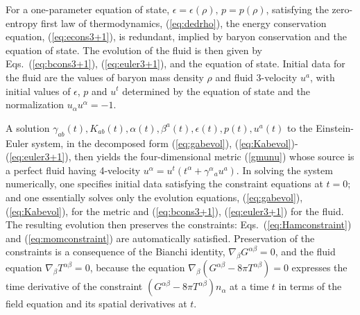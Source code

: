\documentclass[12pt]{article}
\def\a{\alpha}
\def\b{\beta}
\def\g{\gamma}
\def\a{\alpha}
\def\b{\beta}
\begin{document}
{For a one-parameter equation of state, $\epsilon = \epsilon(\rho), \, 
p = p(\rho)$,  satisfying the zero-entropy first law of thermodynamics, (\ref{eq:dedrho}), 
the energy conservation equation, (\ref{eq:econs3+1}), is redundant, implied by baryon conservation and the equation of state. The evolution of the fluid is then 
given by Eqs.~(\ref{eq:bcons3+1}), (\ref{eq:euler3+1}), and the equation 
of state.
%
Initial data for the fluid are the values 
of baryon mass density $\rho$ and fluid 3-velocity $u^a$, with initial values of 
$\epsilon$, $p$ and $u^t$ determined by the equation of state 
and the normalization $u_\alpha u^\alpha= -1$.   

A solution $\g_{ab}(t), K_{ab}(t),\alpha(t), \beta^a(t), \epsilon(t), p(t), u^a(t)$ to 
the Einstein-Euler system, in the decomposed form 
(\ref{eq:gabevol}), (\ref{eq:Kabevol})-(\ref{eq:euler3+1}), then yields 
the four-dimensional metric (\ref{gmunu}) whose source is a perfect fluid 
having 4-velocity $u^\a = u^t( t^\a+\gamma^\a{}_a u^a)$.  
In solving the system numerically, one specifies initial 
data satisfying the constraint equations at $t=0$; and one essentially solves 
only the evolution equations, (\ref{eq:gabevol}), (\ref{eq:Kabevol}), for the metric 
and (\ref{eq:bcons3+1}), (\ref{eq:euler3+1}) for the fluid.  The resulting 
evolution then preserves the constraints: Eqs.~(\ref{eq:Hamconstraint}) and 
(\ref{eq:momconstraint}) are automatically satisfied.  Preservation of the 
constraints is a consequence of the Bianchi identity, $\nabla_\b G^{\a\b}=0$, 
and the fluid equation $\nabla_\beta T^{\a\b}=0$, because the equation 
$\nabla_\b(G^{\a\b}-8\pi T^{\a\b})=0$ expresses the time derivative of 
the constraint $(G^{\a\b}-8\pi T^{\a\b})n_\a$ at a time $t$ 
in terms of the field equation and its spatial derivatives at $t$.  

}
\end{document}
